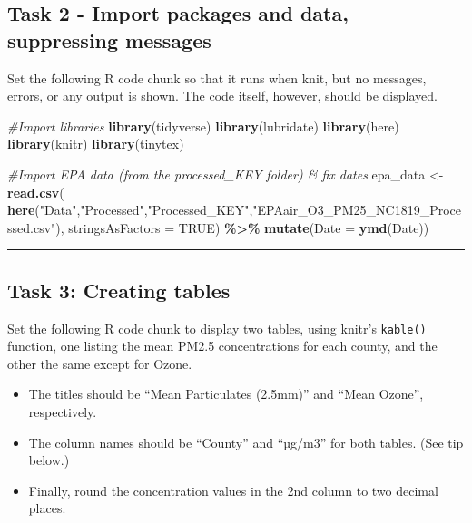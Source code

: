 \documentclass[
]{article}
\newenvironment{Shaded}{\begin{snugshade}}{\end{snugshade}}
\newcommand{\AttributeTok}[1]{\textcolor[rgb]{0.13,0.29,0.53}{#1}}
\newcommand{\CommentTok}[1]{\textcolor[rgb]{0.56,0.35,0.01}{\textit{#1}}}
\newcommand{\ConstantTok}[1]{\textcolor[rgb]{0.56,0.35,0.01}{#1}}
\newcommand{\FunctionTok}[1]{\textcolor[rgb]{0.13,0.29,0.53}{\textbf{#1}}}
\newcommand{\NormalTok}[1]{#1}
\newcommand{\OtherTok}[1]{\textcolor[rgb]{0.56,0.35,0.01}{#1}}
\newcommand{\SpecialCharTok}[1]{\textcolor[rgb]{0.81,0.36,0.00}{\textbf{#1}}}
\newcommand{\StringTok}[1]{\textcolor[rgb]{0.31,0.60,0.02}{#1}}
\providecommand{\tightlist}{%
  \setlength{\itemsep}{0pt}\setlength{\parskip}{0pt}}
\begin{document}
\subsection{Task 2 - Import packages and data, suppressing
messages}\label{task-2---import-packages-and-data-suppressing-messages}

Set the following R code chunk so that it runs when knit, but no
messages, errors, or any output is shown. The code itself, however,
should be displayed.

\begin{Shaded}
\begin{Highlighting}[]
\CommentTok{\#Import libraries}
\FunctionTok{library}\NormalTok{(tidyverse)}
\FunctionTok{library}\NormalTok{(lubridate)}
\FunctionTok{library}\NormalTok{(here)}
\FunctionTok{library}\NormalTok{(knitr)}
\FunctionTok{library}\NormalTok{(tinytex)}


\CommentTok{\#Import EPA data (from the processed\_KEY folder) \& fix dates}
\NormalTok{epa\_data }\OtherTok{\textless{}{-}} \FunctionTok{read.csv}\NormalTok{(}
  \FunctionTok{here}\NormalTok{(}\StringTok{"Data"}\NormalTok{,}\StringTok{"Processed"}\NormalTok{,}\StringTok{"Processed\_KEY"}\NormalTok{,}\StringTok{"EPAair\_O3\_PM25\_NC1819\_Processed.csv"}\NormalTok{),}
  \AttributeTok{stringsAsFactors =} \ConstantTok{TRUE}\NormalTok{) }\SpecialCharTok{\%\textgreater{}\%} 
  \FunctionTok{mutate}\NormalTok{(}\AttributeTok{Date =} \FunctionTok{ymd}\NormalTok{(Date))}
\end{Highlighting}
\end{Shaded}

\begin{center}\rule{0.5\linewidth}{0.5pt}\end{center}

\subsection{Task 3: Creating tables}\label{task-3-creating-tables}

Set the following R code chunk to display two tables, using knitr's
\texttt{kable()} function, one listing the mean PM2.5 concentrations for
each county, and the other the same except for Ozone.

\begin{itemize}
\tightlist
\item
  The titles should be ``Mean Particulates (2.5mm)'' and ``Mean Ozone'',
  respectively.
\item
  The column names should be ``County'' and ``µg/m3'' for both tables.
  (See tip below.)
\item
  Finally, round the concentration values in the 2nd column to two
  decimal places.
\end{itemize}
\end{document}
